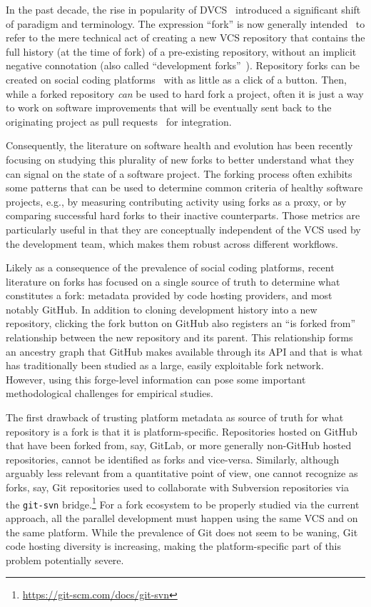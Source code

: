 In the past decade, the rise in popularity of
\gls{DVCS}~\cite{spinellis2005vcs} introduced a significant shift of paradigm
and terminology. The expression ``fork'' is now generally
intended~\cite{zhou2019fork} to refer to the mere technical act of creating a
new \gls{VCS} repository that contains the full history (at the time of fork)
of a pre-existing repository, without an implicit negative connotation (also
called ``development forks''~\cite{fogel2005producingoss}). Repository forks
can be created on social coding platforms~\cite{dabbish2012socialcoding,
thung2013network} with as little as a click of a button. Then, while a forked
repository \emph{can} be used to hard fork a project, often it is just a way to
work on software improvements that will be eventually sent back to the
originating project as pull requests~\cite{gousios2014pullrequests} for
integration.

Consequently, the literature on software health and evolution has been
recently focusing on studying this plurality of new forks to better
understand what they can signal on the state of a software project. The
forking process often exhibits some patterns that can be used to determine
common criteria of healthy software projects, e.g., by measuring contributing
activity using forks as a proxy, or by comparing successful hard forks to
their inactive counterparts. Those metrics are particularly useful in that
they are conceptually independent of the \gls{VCS} used by the development
team, which makes them robust across different workflows.

Likely as a consequence of the prevalence of social coding platforms, recent
literature on forks has focused on a single source of truth to determine what
constitutes a fork: metadata provided by code hosting providers, and most
notably GitHub. In addition to cloning development history into a new
repository, clicking the fork button on GitHub also registers an ``is forked
from'' relationship between the new repository and its parent. This
relationship forms an ancestry graph that GitHub makes available through its
API and that is what has traditionally been studied as a large, easily
exploitable fork network. However, using this forge-level information can pose
some important methodological challenges for empirical studies.

The first drawback of trusting platform metadata as source of truth for what
repository is a fork is that it is platform-specific.  Repositories hosted on
GitHub that have been forked from, say, GitLab, or more generally non-GitHub
hosted repositories, cannot be identified as forks and vice-versa. Similarly,
although arguably less relevant from a quantitative point of view, one cannot
recognize as forks, say, Git repositories used to collaborate with Subversion
repositories via the \texttt{git-svn}
bridge.\footnote{\url{https://git-scm.com/docs/git-svn}} For a fork ecosystem
to be properly studied via the current approach, all the parallel development
must happen using the same \gls{VCS} and on the same platform. While the
prevalence of Git does not seem to be waning, Git code hosting diversity is
increasing, making the platform-specific part of this problem potentially
severe.

